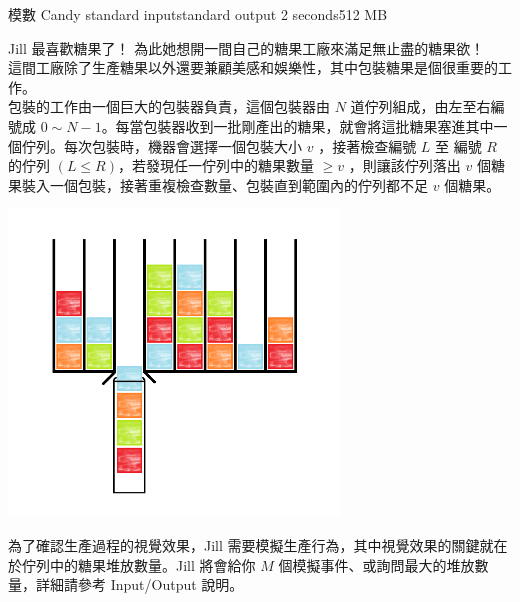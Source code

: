 \gdef\thisproblemauthor{}
\gdef\thisproblemdeveloper{}
\gdef\thisproblemorigin{}
\begin{problem}{模數 Candy} %
{standard input}{standard output}
{2 seconds}{512 MB}{}

Jill 最喜歡糖果了！\newline
為此她想開一間自己的糖果工廠來滿足無止盡的糖果欲！\\
\newline
這間工廠除了生產糖果以外還要兼顧美感和娛樂性，其中包裝糖果是個很重要的工作。\\
包裝的工作由一個巨大的包裝器負責，這個包裝器由 $N$ 道佇列組成，由左至右編號成 $0 \sim N-1$。每當包裝器收到一批剛產出的糖果，就會將這批糖果塞進其中一個佇列。每次包裝時，機器會選擇一個包裝大小 $v$ ，接著檢查編號 $L$ 至 編號 $R$ 的佇列 $(L\leq R)$，若發現任一佇列中的糖果數量 $ \geq v $ ，則讓該佇列落出 $v$ 個糖果裝入一個包裝，接著重複檢查數量、包裝直到範圍內的佇列都不足 $v$ 個糖果。\\
\centerline{\includegraphics[height=22em]{./pics/E-1.png}}
\newline
為了確認生產過程的視覺效果，Jill 需要模擬生產行為，其中視覺效果的關鍵就在於佇列中的糖果堆放數量。Jill 將會給你 $M$ 個模擬事件、或詢問最大的堆放數量，詳細請參考 Input/Output 說明。\\
\newline
\InputFile


\end{problem}

